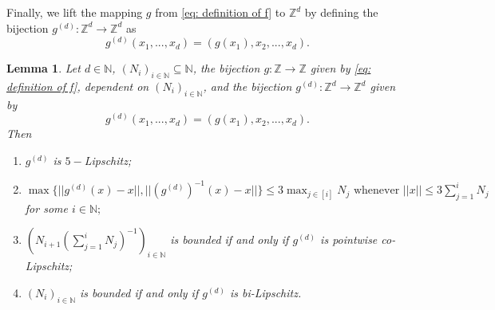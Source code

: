 \documentclass{article}
\newtheorem{lemma}[define]{Lemma}
\newcommand{\Z}{\mathbb{Z}}
\newcommand{\N}{\mathbb{N}}
\begin{document}
Finally, we lift the mapping $g$ from \eqref{eq: definition of f} to $\Z^d$ by defining the bijection $g^{(d)}:\Z^d \to \Z^d$ as \begin{equation} \label{eq: definition of fd}
     g^{(d)}(x_1,...,x_d) = (g(x_1),x_2,...,x_d).
 \end{equation}
\begin{lemma} \label{lemma: bilipschitz properties}
    Let $d \in \N$, $(N_i)_{i \in \N} \subseteq \N$, the bijection $g:\Z \to \Z$ given by \eqref{eq: definition of f}, dependent on $(N_i)_{i \in \N}$, and the bijection $g^{(d)}:\Z^d \to \Z^d$ given by
    \begin{equation*} \label{eq: fd}
     g^{(d)}(x_1,...,x_d) = (g(x_1),x_2,...,x_d).
 \end{equation*}
    Then
    \begin{enumerate}
    \item $g^{(d)}$ is $5-$Lipschitz;
    \item \label{enumerate: gd} $\max\{||g^{(d)}(x)-x||,||(g^{(d)})^{-1}(x)-x||\} \leq 3\max_{j \in [i]}N_j \text{ whenever $||x|| \leq 3\sum_{j=1}^iN_j$}$ for some $i \in \N;$
        \item \label{point 3, lemma 4.9} $\left(N_{i+1}(\sum_{j=1}^{i}N_j)^{-1}\right)_{i \in \N}$ is bounded if and only if $g^{(d)}$ is pointwise co-Lipschitz;
        \item \label{point 4} $(N_i)_{i \in \N}$ is bounded if and only if $g^{(d)}$ is bi-Lipschitz.
    \end{enumerate}
\end{lemma}
\end{document}
